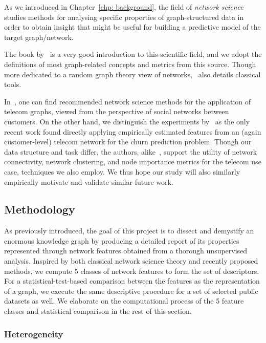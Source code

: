 As we introduced in Chapter~\ref{chp: background}, the field of \emph{network science} studies methods for analysing specific properties of graph-structured data in order to obtain insight that might be useful for building a predictive model of the target graph/network. 

The book by~\cite{barabasi_network_2016} is a very good introduction to this scientific field, and we adopt the definitions of most graph-related concepts and metrics from this source. Though more dedicated to a random graph theory view of networks,~\cite{lewis_network_2011} also details classical tools.

In~\cite{pinheiro_social_2011}, one can find recommended network science methods for the application of telecom graphs, viewed from the perspective of social networks between customers. On the other hand, we distinguish the experiments by~\cite{kostic_social_2020} as the only recent work found directly applying empirically estimated features from an (again customer-level) telecom network for the churn prediction problem. Though our data structure and task differ, the authors, alike~\cite{pinheiro_social_2011}, support the utility of network connectivity, network clustering, and node importance metrics for the telecom use case, techniques we also employ. We thus hope our study will also similarly empirically motivate and validate similar future work.

\subsection{Methodology}
\label{sec:methodology_swisscom}

As previously introduced, the goal of this project is to dissect and demystify an enormous knowledge graph by producing a detailed report of its properties represented through network features obtained from a thorough unsupervised analysis. Inspired by both classical network science theory and recently proposed methods, we compute 5 classes of network features to form the set of descriptors. For a statistical-test-based comparison between the features as the representation of a graph, we execute the same descriptive procedure for a set of selected public datasets as well. We elaborate on the computational process of the 5 feature classes and statistical comparison in the rest of this section.

\subsubsection{Heterogeneity}


